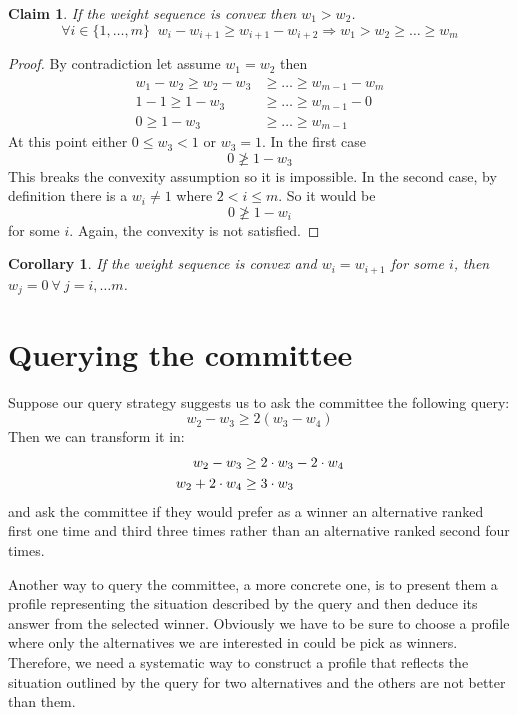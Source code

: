 \documentclass[12pt]{article}
\newtheorem{claim}{Claim}
\newtheorem{corollary}{Corollary}
\begin{document}
\begin{claim}
	\label{clm:wsequence}
	If the weight sequence is convex then $w_{1} > w_{2}$.
	\[\forall i \in \{1,\ldots,m\} \;\; w_i - w_{i+1} \geq w_{i+1}-w_{i+2} \Rightarrow w_{1} > w_{2} \geq \ldots \geq w_{m}\] 
\end{claim}
\begin{proof}
	By contradiction let assume $w_{1} = w_{2}$ then 
	\begin{align*}
	w_{1} - w_{2} \geq w_{2} - w_{3} &\geq \dots \geq w_{m-1} - w_{m} \\
	1 - 1 \geq 1 - w_{3} &\geq \dots \geq w_{m-1} - 0 \\
	0 \geq 1 - w_{3} &\geq \dots \geq w_{m-1}
	\end{align*}
	At this point either $0\leq w_{3}<1$ or $w_{3}=1$. In the first case 
	\[0 \ngeq 1 - w_{3}\]
	This breaks the convexity assumption so it is impossible.
	In the second case, by definition there is a $w_{i} \neq 1$ where $2 < i \leq m$. So it would be 
	\[0 \ngeq 1 - w_{i}\]
	for some $i$. Again, the convexity is not satisfied.
\end{proof}

\begin{corollary}
	\label{cor:weq}
	If the weight sequence is convex and $w_{i} = w_{i+1}$ for some $i$, then $w_{j}=0 \ \forall \
	j=i, \dots m$.
\end{corollary}


\section{Querying the committee}
Suppose our query strategy suggests us to ask the committee the following query:
\[ w_{2} - w_{3} \geq 2(w_{3} - w_{4}) \]
Then we can transform it in:
\begin{align}
\label{eqn:juryquery}
w_{2} - w_{3} &\geq 2 \cdot w_{3} - 2 \cdot w_{4} \notag \\
w_{2} + 2 \cdot w_{4} &\geq 3 \cdot w_{3} 
\end{align}
and ask the committee if they would prefer as a winner an alternative ranked first one time and third three times rather than an alternative ranked second four times.

Another way to query the committee, a more concrete one, is to present them a profile representing the situation described by the query and then deduce its answer from the selected winner. Obviously we have to be sure to choose a profile where only the alternatives we are interested in could be pick as winners. Therefore, we need a systematic way to construct a profile that reflects the situation outlined by the query for two alternatives and the others are not better than them.
\end{document}
